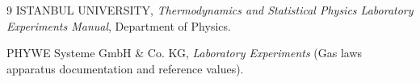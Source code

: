 \documentclass[journal]{IEEEtran}
\begin{document}
\begin{thebibliography}{9}
	ISTANBUL UNIVERSITY, \textit{Thermodynamics and Statistical Physics Laboratory Experiments Manual}, Department of Physics.

	PHYWE Systeme GmbH \& Co. KG, \textit{Laboratory Experiments} (Gas laws apparatus documentation and reference values).
\end{thebibliography}
\end{document}
